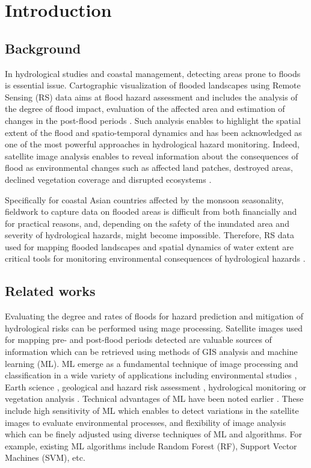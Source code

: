 \documentclass[water,article,submit,pdftex,moreauthors]{Definitions/mdpi}
\begin{document}
\section{Introduction}

\subsection{Background}
In hydrological studies and coastal management, detecting areas prone to floods is essential issue. Cartographic visualization of flooded landscapes using Remote Sensing (RS) data aims at flood hazard assessment and includes the analysis of the degree of flood impact, evaluation of the affected area and estimation of changes in the post-flood periods \cite{su142114145,w15152802,su142316270}. Such analysis enables to highlight the spatial extent of the flood and spatio-temporal dynamics and has been acknowledged as one of the most powerful approaches in hydrological hazard monitoring. Indeed, satellite image analysis enables to reveal information about the consequences of flood as environmental changes such as affected land patches, destroyed areas, declined vegetation coverage and disrupted ecosystems \cite{ijgi12110465,rs15102561}. 

Specifically for coastal Asian countries affected by the monsoon seasonality, fieldwork to capture data on flooded areas is difficult from both financially and for practical reasons, and, depending on the safety of the inundated area and severity of hydrological hazards, might become impossible. Therefore, RS data used for mapping flooded landscapes and spatial dynamics of water extent are critical tools for monitoring environmental consequences of hydrological hazards \cite{YASEEN2024101665,GHALEHTEIMOURI2023}. 

\subsection{Related works}

Evaluating the degree and rates of floods for hazard prediction and mitigation of hydrological risks can be performed using mage processing. Satellite images used for mapping pre- and post-flood periods detected are valuable sources of information which can be retrieved using methods of GIS analysis and machine learning (ML). ML emerge as a fundamental technique of image processing and classification in a wide variety of applications including environmental studies \cite{ROCHA2022107415}, Earth science \cite{LI2023103345,Lemenkova202306,XIONG2021145256}, geological and hazard risk assessment \cite{AOURAGH2023100939}, hydrological monitoring \cite{RAFIK2023101569} or vegetation analysis \cite{WU2023110723,Lemenkova202310,DOSSANTOS2022106753}. Technical advantages of ML have been noted earlier \cite{9883389,coasts4010008}. These include high sensitivity of ML which enables to detect variations in the satellite images to evaluate environmental processes, and flexibility of image analysis which can be finely adjusted using diverse techniques of ML and algorithms. For example, existing ML algorithms include Random Forest (RF), Support Vector Machines (SVM), etc.
\end{document}
